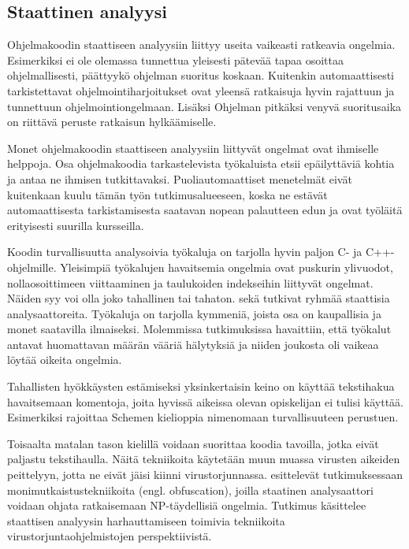 \subsection{Staattinen analyysi}

Ohjelmakoodin staattiseen analyysiin liittyy useita vaikeasti ratkeavia
ongelmia. Esimerkiksi ei ole olemassa tunnettua yleisesti pätevää
tapaa osoittaa ohjelmallisesti, päättyykö ohjelman suoritus koskaan. Kuitenkin
automaattisesti tarkistettavat ohjelmointiharjoitukset ovat yleensä ratkaisuja
hyvin rajattuun ja tunnettuun ohjelmointiongelmaan. Lisäksi Ohjelman pitkäksi
venyvä suoritusaika on riittävä peruste ratkaisun hylkäämiselle.

Monet ohjelmakoodin staattiseen analyysiin liittyvät ongelmat ovat ihmiselle
helppoja. Osa ohjelmakoodia tarkastelevista työkaluista etsii epäilyttäviä
kohtia ja antaa ne ihmisen tutkittavaksi. \citep{taft2008systematic} Puoliautomaattiset
menetelmät eivät kuitenkaan kuulu tämän työn tutkimusalueeseen, koska ne
estävät automaattisesta tarkistamisesta saatavan nopean palautteen edun ja
ovat työläitä erityisesti suurilla kursseilla.

Koodin turvallisuutta analysoivia työkaluja on tarjolla hyvin paljon C- ja
C++-ohjelmille. Yleisimpiä työkalujen havaitsemia ongelmia ovat puskurin
ylivuodot, nollaosoittimeen viittaaminen ja taulukoiden indekseihin liittyvät
ongelmat. Näiden syy voi olla joko tahallinen tai tahaton.
\citet{tevis2004methods} sekä \citet{heffley2004can} tutkivat ryhmää staattisia
analysaattoreita. Työkaluja on tarjolla kymmeniä, joista osa on kaupallisia ja
monet saatavilla ilmaiseksi. Molemmissa tutkimuksissa havaittiin, että työkalut
antavat huomattavan määrän vääriä hälytyksiä ja niiden joukosta oli vaikeaa
löytää oikeita ongelmia. 

Tahallisten hyökkäysten estämiseksi yksinkertaisin keino on käyttää
tekstihakua havaitsemaan komentoja, joita hyvissä aikeissa olevan opiskelijan
ei tulisi käyttää. Esimerkiksi {\scmrobo} rajoittaa Schemen kielioppia
nimenomaan turvallisuuteen perustuen.

Toisaalta matalan tason kielillä voidaan suorittaa koodia tavoilla, jotka
eivät paljastu tekstihaulla. Näitä tekniikoita käytetään muun muassa virusten
aikeiden peittelyyn, jotta ne eivät jäisi kiinni virustorjunnassa.
\citet{moser2007limits} esittelevät tutkimuksessaan monimutkaistustekniikoita (engl. obfuscation),
joilla staatinen analysaattori voidaan ohjata ratkaisemaan NP-täydellisiä
ongelmia. Tutkimus käsittelee staattisen analyysin harhauttamiseen toimivia
tekniikoita virustorjuntaohjelmistojen perspektiivistä.

